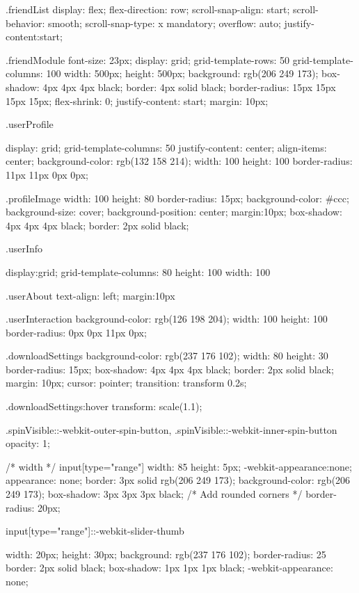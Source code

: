 \documentclass[12pt]{article} %
\begin{document}
\begin{htmlcode}[caption={CSS Stlye Sheet}]
{}
.friendList {
   display: flex;
   flex-direction: row;
   scroll-snap-align: start;
   scroll-behavior: smooth;
   scroll-snap-type: x mandatory;
   overflow: auto;
   justify-content:start;
}

.friendModule
{
   font-size: 23px;
   display: grid;
   grid-template-rows: 50%
   grid-template-columns: 100%
   width: 500px;
   height: 500px;
   background: rgb(206 249 173);
   box-shadow: 4px 4px 4px black;
   border: 4px solid black;
   border-radius: 15px 15px 15px 15px;
   flex-shrink: 0;
   justify-content: start;
   margin: 10px;
}

.userProfile
{
   display: grid;
   grid-template-columns: 50%
   justify-content: center;
   align-items: center;
   background-color: rgb(132 158 214);
   width: 100%
   height: 100%
   border-radius: 11px 11px 0px 0px;

}

.profileImage
{
      width: 100%
      height: 80%
      border-radius: 15px;
      background-color: #ccc;
      background-size: cover;
      background-position: center;
      margin:10px;
      box-shadow: 4px 4px 4px black;
      border: 2px solid black;
}

.userInfo
{
   display:grid;
   grid-template-columns: 80%
   height: 100%
   width: 100%

}

.userAbout
{
   text-align: left;
   margin:10px
}


.userInteraction
{
   background-color: rgb(126 198 204);
   width: 100%
   height: 100%
   border-radius: 0px 0px 11px 0px;
}


.downloadSettings{
   background-color: rgb(237 176 102);
   width: 80%
   height: 30%
   border-radius: 15px;
   box-shadow: 4px 4px 4px black;
   border: 2px solid black;
   margin: 10px;
   cursor: pointer;
   transition: transform 0.2s; 
}

.downloadSettings:hover {
   transform: scale(1.1);
}


.spinVisible::-webkit-outer-spin-button,
.spinVisible::-webkit-inner-spin-button 
{
    opacity: 1;
}

/* width */
input[type="range"] {
   width: 85%
   height: 5px;
   -webkit-appearance:none;
   appearance: none;
   border: 3px solid rgb(206 249 173);
   background-color: rgb(206 249 173);
   box-shadow: 3px 3px 3px black;
   /* Add rounded corners */
   border-radius: 20px;
 }

 input[type="range"]::-webkit-slider-thumb 
 {
   width: 20px;
   height: 30px;
   background: rgb(237 176 102);
   border-radius: 25%
   border: 2px solid black;
   box-shadow: 1px 1px 1px black;
   -webkit-appearance: none;

}
\end{htmlcode}
\end{document}
